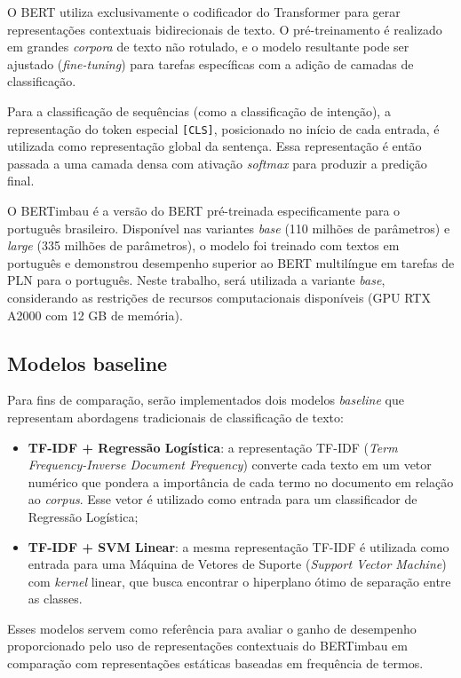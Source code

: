 \documentclass[
    12pt,                %
    openright,           %
    oneside,             %
    a4paper,             %
    english,             %
    brazil               %
]{abntex2}
\begin{document}
O BERT \cite{Devlin2019} utiliza exclusivamente o codificador do Transformer para gerar representações contextuais bidirecionais de texto. O pré-treinamento é realizado em grandes \textit{corpora} de texto não rotulado, e o modelo resultante pode ser ajustado (\textit{fine-tuning}) para tarefas específicas com a adição de camadas de classificação.

Para a classificação de sequências (como a classificação de intenção), a representação do token especial \texttt{[CLS]}, posicionado no início de cada entrada, é utilizada como representação global da sentença. Essa representação é então passada a uma camada densa com ativação \textit{softmax} para produzir a predição final.

O BERTimbau \cite{Souza2020} é a versão do BERT pré-treinada especificamente para o português brasileiro. Disponível nas variantes \textit{base} (110 milhões de parâmetros) e \textit{large} (335 milhões de parâmetros), o modelo foi treinado com textos em português e demonstrou desempenho superior ao BERT multilíngue em tarefas de PLN para o português. Neste trabalho, será utilizada a variante \textit{base}, considerando as restrições de recursos computacionais disponíveis (GPU RTX A2000 com 12 GB de memória).

\subsection{Modelos baseline}

Para fins de comparação, serão implementados dois modelos \textit{baseline} que representam abordagens tradicionais de classificação de texto:

\begin{itemize}
    \item \textbf{TF-IDF + Regressão Logística}: a representação TF-IDF (\textit{Term Frequency-Inverse Document Frequency}) converte cada texto em um vetor numérico que pondera a importância de cada termo no documento em relação ao \textit{corpus}. Esse vetor é utilizado como entrada para um classificador de Regressão Logística;
    \item \textbf{TF-IDF + SVM Linear}: a mesma representação TF-IDF é utilizada como entrada para uma Máquina de Vetores de Suporte (\textit{Support Vector Machine}) com \textit{kernel} linear, que busca encontrar o hiperplano ótimo de separação entre as classes.
\end{itemize}

Esses modelos servem como referência para avaliar o ganho de desempenho proporcionado pelo uso de representações contextuais do BERTimbau em comparação com representações estáticas baseadas em frequência de termos.
\end{document}
